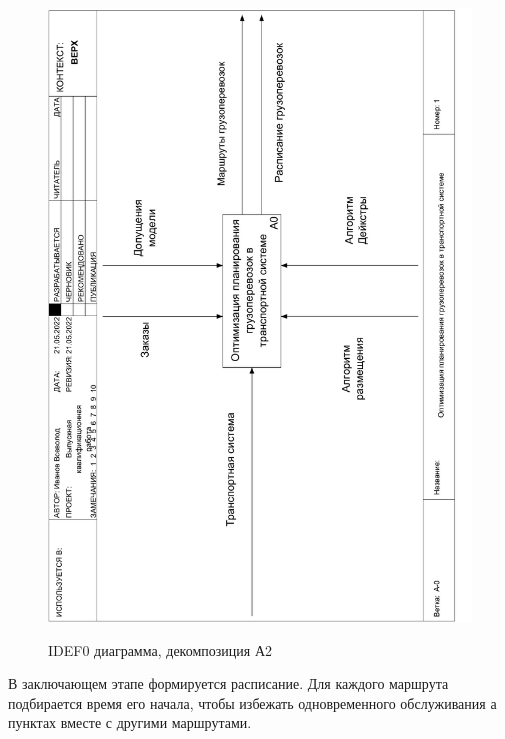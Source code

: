\pagebreak
\begin{figure}[h]
	\begin{center}
		{\includegraphics[scale=0.63, angle=-90, page=4]{img/idef0.pdf}}
		\caption{IDEF0 диаграмма, декомпозиция А2}
		\label{idef0:A2}
	\end{center}
\end{figure}

В заключающем этапе формируется расписание. Для каждого маршрута подбирается время его начала, чтобы избежать одновременного обслуживания а пунктах вместе с другими маршрутами.

